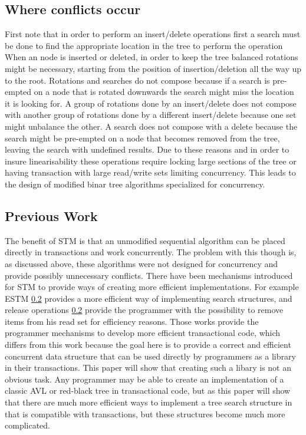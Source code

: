 \documentclass[10pt]{sigplanconf}
\begin{document}
\subsection{Where conflicts occur}
First note that in order to perform an insert/delete operations first a search must be done to find the appropriate location in the tree to perform the operation
When an node is inserted or deleted, in order to keep the tree balanced rotations might be necessary, starting from the position of insertion/deletion all the way up to the root.
Rotations and searches do not compose because if a search is pre-empted on a node that is rotated downwards the search might miss the location it is looking for.
A group of rotations done by an insert/delete does not compose with another group of rotations done by a different insert/delete because one set might unbalance the other.
A search does not compose with a delete because the search might be pre-empted on a node that becomes removed from the tree, leaving the search with undefined results.
Due to these reasons and in order to insure linearisability these operations require locking large sections of the tree or having transaction with large read/write sets limiting concurrency.
This leads to the design of modified binar tree algorithms specialized for concurrency.
\subsection{Previous Work}
The benefit of STM is that an unmodified sequential algorithm can be placed directly in transactions and work concurrently.
The problem with this though is, as discussed above, these algorithms were not designed for concurrency and provide possibly unnecessary conflicts.
There have been mechanisms introduced for STM to provide ways of creating more efficient implementations.
For example ESTM \ref{} provides a more efficient way of implementing search structures, and release operations \ref{} provide the programmer with the possibility to remove items from his read set for efficiency reasons.
Those works provide the programmer mechanisms to develop more efficient transactional code, which differs from this work because the goal here is to provide a correct and efficient concurrent data structure that can be used directly by programmers as a library in their transactions.
This paper will show that creating such a libary is not an obvious task.
Any programmer may be able to create an implementation of a classic AVL or red-black tree in transactional code, but as this paper will show
that there are much more efficient ways to implement a tree search structure in that is compatible with transactions, but these structures become much more complicated.
\end{document}
